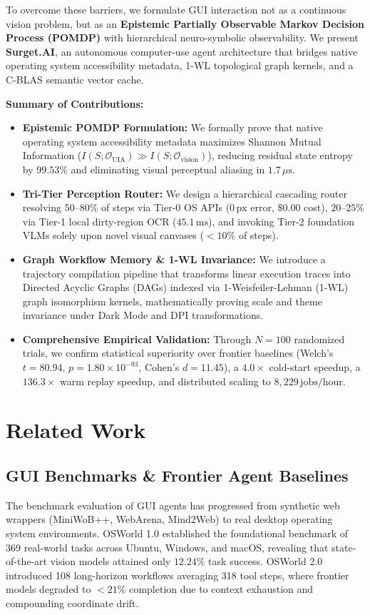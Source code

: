 \documentclass[10pt]{article}
\begin{document}
To overcome these barriers, we formulate GUI interaction not as a continuous vision problem, but as an \textbf{Epistemic Partially Observable Markov Decision Process (POMDP)} with hierarchical neuro-symbolic observability. We present \textbf{Surget.AI}, an autonomous computer-use agent architecture that bridges native operating system accessibility metadata, 1-WL topological graph kernels, and a C-BLAS semantic vector cache.

\textbf{Summary of Contributions:}
\begin{itemize}[leftmargin=*]
    \item \textbf{Epistemic POMDP Formulation:} We formally prove that native operating system accessibility metadata maximizes Shannon Mutual Information ($I(S; \mathcal{O}_{\text{UIA}}) \gg I(S; \mathcal{O}_{\text{vision}})$), reducing residual state entropy by $99.53\%$ and eliminating visual perceptual aliasing in $1.7\,\mu\text{s}$.
    \item \textbf{Tri-Tier Perception Router:} We design a hierarchical cascading router resolving $50\text{--}80\%$ of steps via Tier-0 OS APIs ($0\,\text{px}$ error, $\$0.00$ cost), $20\text{--}25\%$ via Tier-1 local dirty-region OCR ($45.1\,\text{ms}$), and invoking Tier-2 foundation VLMs solely upon novel visual canvases ($<10\%$ of steps).
    \item \textbf{Graph Workflow Memory \& 1-WL Invariance:} We introduce a trajectory compilation pipeline that transforms linear execution traces into Directed Acyclic Graphs (DAGs) indexed via 1-Weisfeiler-Lehman (1-WL) graph isomorphism kernels, mathematically proving scale and theme invariance under Dark Mode and DPI transformations.
    \item \textbf{Comprehensive Empirical Validation:} Through $N=100$ randomized trials, we confirm statistical superiority over frontier baselines (Welch's $t = 80.94$, $p = 1.80 \times 10^{-93}$, Cohen's $d = 11.45$), a $4.0\times$ cold-start speedup, a $136.3\times$ warm replay speedup, and distributed scaling to $8,229\,\text{jobs/hour}$.
\end{itemize}

\section{Related Work}
\label{sec:related}

\subsection{GUI Benchmarks \& Frontier Agent Baselines}
The benchmark evaluation of GUI agents has progressed from synthetic web wrappers (MiniWoB++, WebArena, Mind2Web) to real desktop operating system environments. OSWorld 1.0 \cite{xie2024osworld} established the foundational benchmark of 369 real-world tasks across Ubuntu, Windows, and macOS, revealing that state-of-the-art vision models attained only $12.24\%$ task success. OSWorld 2.0 \cite{xlang2026osworld2} introduced 108 long-horizon workflows averaging 318 tool steps, where frontier models degraded to $<21\%$ completion due to context exhaustion and compounding coordinate drift.
\end{document}
